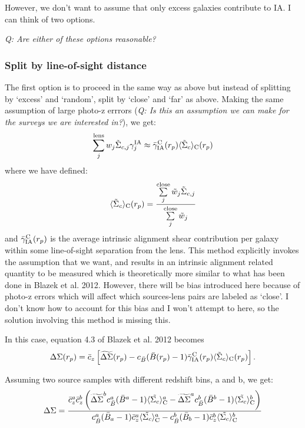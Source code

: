 \documentclass[onecolumn,amsmath,aps,fleqn, superscriptaddress]{revtex4}
\begin{document}
{However, we don't want to assume that only excess galaxies contribute to IA. I can think of two options. 

{\it Q: Are either of these options reasonable?}

\subsubsection*{Split by line-of-sight distance}

The first option is to proceed in the same way as above but instead of splitting by `excess' and `random', split by `close' and `far' as above. Making the same assumption of large photo-z errrors ({\it Q: Is this an assumption we can make for the surveys we are interested in?}), we get:
\begin{equation}
\sum\limits_{j}^{\rm lens} w_j \tilde{\Sigma}_{c,j} \gamma^{\rm IA}_j \approx \bar{\gamma}^{\rm C}_{\rm IA}(r_p)\langle \tilde{\Sigma}_c\rangle_{\rm C} (r_p)
\label{splitIAclose}
\end{equation}
where we have defined:
\begin{equation}
\langle \tilde{\Sigma}_c\rangle_{\rm C} (r_p) = \frac{\sum\limits_{j}^{\rm close} \tilde{w}_j \tilde{\Sigma}_{c,j}}{\sum\limits_{j}^{\rm close} \tilde{w}_j}
\label{Sigmaclose}
\end{equation}
and $\bar{\gamma}^{\rm C}_{\rm IA}(r_p)$ is the average intrinsic alignment shear contribution per galaxy within some line-of-sight separation from the lens. This method explicitly invokes the assumption that we want, and results in an intrinsic alignment related quantity to be measured which is theoretically more similar to what has been done in Blazek et al. 2012. However, there will be bias introduced here because of photo-z errors which will affect which sources-lens pairs are labeled as `close'. I don't know how to account for this bias and I won't attempt to here, so the solution involving this method is missing this.

In this case, equation 4.3 of Blazek et al. 2012 becomes 
\begin{equation}
\Delta \Sigma(r_p) = \bar{c}_z\left[\widetilde{\Delta \Sigma}(r_p) - c_{\bar B} (\bar{B}(r_p)-1) \bar{\gamma}_{\rm IA}^{\rm C}(r_p) \langle \tilde{\Sigma}_c\rangle_{\rm C} (r_p) \right].
\label{deltasigma_splitLOS}
\end{equation}

Assuming two source samples with different redshift bins, a and b, we get:
\begin{equation}
\Delta\Sigma= \frac{\bar{c}_z^a \bar{c}_z^b\left(\widetilde{\Delta \Sigma}^bc_{\bar B}^a(\bar{B}^a-1)\langle \tilde{\Sigma_c}\rangle_{\rm C}^a - \widetilde{\Delta \Sigma}^ac_{\bar B}^b(\bar{B}^b-1)\langle \tilde{\Sigma_c}\rangle_{\rm C}^b\right)}{c_{\bar B}^a (\bar{B}_a-1)\bar{c}_z^a\langle \tilde{\Sigma_c} \rangle_{\rm C}^a - c_{\bar B}^b (\bar{B}_b-1)\bar{c}_z^b\langle \tilde{\Sigma_c} \rangle_{\rm C}^b}
\label{Deltasigma_sol_splitLOS}
\end{equation}

}
\end{document}
